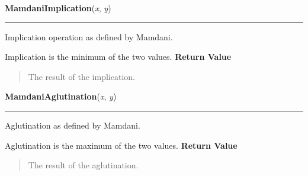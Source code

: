     \label{peach:fuzzy:norms:MamdaniImplication}

    \vspace{0.5ex}

\hspace{.8\funcindent}\begin{boxedminipage}{\funcwidth}

    \raggedright \textbf{MamdaniImplication}(\textit{x}, \textit{y})

    \vspace{-1.5ex}

    \rule{\textwidth}{0.5\fboxrule}
\setlength{\parskip}{2ex}

Implication operation as defined by Mamdani.

Implication is the minimum of the two values.
\setlength{\parskip}{1ex}
      \textbf{Return Value}
    \vspace{-1ex}

      \begin{quote}

The result of the implication.
      \end{quote}

    \end{boxedminipage}

    \label{peach:fuzzy:norms:MamdaniAglutination}

    \vspace{0.5ex}

\hspace{.8\funcindent}\begin{boxedminipage}{\funcwidth}

    \raggedright \textbf{MamdaniAglutination}(\textit{x}, \textit{y})

    \vspace{-1.5ex}

    \rule{\textwidth}{0.5\fboxrule}
\setlength{\parskip}{2ex}

Aglutination as defined by Mamdani.

Aglutination is the maximum of the two values.
\setlength{\parskip}{1ex}
      \textbf{Return Value}
    \vspace{-1ex}

      \begin{quote}

The result of the aglutination.
      \end{quote}

    \end{boxedminipage}

